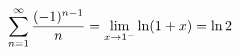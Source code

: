 \documentclass[preview]{standalone}
\begin{document}
\begin{align*}
\special{dvisvgm:raw <g id='unique000'>}\displaystyle\sum_{n=1}^{\infty}\dfrac{(-1)^{n-1}}{n}=\lim_{x\to 1^-}\ln(1+x)=\ln 2\special{dvisvgm:raw </g>}
\end{align*}
\end{document}
